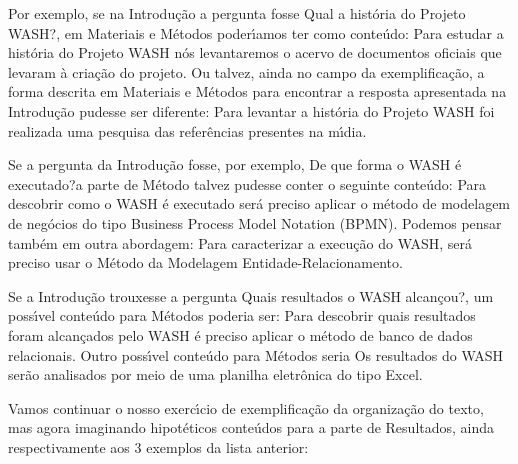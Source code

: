 \documentclass[
12pt,		%
openright,	%
twoside,  %
a4paper,			%
chapter=TITLE,		%
english,			%
french,				%
spanish,			%
brazil				%
]{USPSC-classe/USPSC}
\begin{document}
\begin{alineas}
\item Por exemplo, se na Introdu\c{c}\~ao a pergunta fosse \textquotedbl Qual a hist\'oria do Projeto WASH?\textquotedbl , em Materiais e M\'etodos poder\'{\i}amos ter como  conte\'udo: \textquotedbl Para estudar a hist\'oria do Projeto WASH n\'os levantaremos o acervo de documentos oficiais que levaram \`a cria\c{c}\~ao do projeto\textquotedbl . Ou talvez, ainda no campo da exemplifica\c{c}\~ao, a forma descrita em Materiais e M\'etodos para  encontrar a resposta apresentada na Introdu\c{c}\~ao pudesse ser diferente: \textquotedbl Para levantar a hist\'oria do Projeto WASH foi realizada uma pesquisa das refer\^encias presentes na m\'{\i}dia\textquotedbl .
\item Se a pergunta da Introdu\c{c}\~ao fosse, por exemplo, \textquotedbl De que forma o WASH \'e executado?\textquotedbl  a parte de M\'etodo talvez pudesse conter o seguinte conte\'udo: \textquotedbl Para descobrir como o WASH \'e executado ser\'a preciso aplicar o m\'etodo de modelagem de neg\'ocios do tipo Business Process Model Notation (BPMN)\textquotedbl . Podemos pensar tamb\'em em outra abordagem: \textquotedbl Para caracterizar a execu\c{c}\~ao do WASH, ser\'a preciso usar o M\'etodo da Modelagem Entidade-Relacionamento\textquotedbl .
\item Se a Introdu\c{c}\~ao trouxesse a pergunta \textquotedbl Quais resultados o WASH alcan\c{c}ou?\textquotedbl , um poss\'{\i}vel conte\'udo para M\'etodos poderia ser: \textquotedbl Para descobrir quais resultados foram alcan\c{c}ados pelo WASH \'e preciso aplicar o m\'etodo de banco de dados relacionais\textquotedbl . Outro poss\'{\i}vel conte\'udo para M\'etodos seria \textquotedbl Os resultados do WASH ser\~ao analisados por meio de uma planilha eletr\^onica do tipo Excel\textquotedbl .
\end{alineas}

Vamos continuar o nosso exerc\'{\i}cio de exemplifica\c{c}\~ao da organiza\c{c}\~ao do texto, mas agora imaginando hipot\'eticos conte\'udos para a parte de Resultados, ainda respectivamente aos 3 exemplos da lista anterior:
\end{document}
